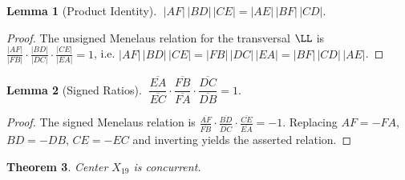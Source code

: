\documentclass[12pt,a4paper]{amsart}
\newtheorem{theorem}{Theorem} [section]
\newtheorem{lemma}[theorem]{Lemma}
\theoremstyle{remark}
\newcommand{\seg}[1]{\overline{#1}}
\begin{document}
\begin{lemma}[Product Identity]\label{lem:men1}
$\;|AF|\,|BD|\,|CE|=|AE|\,|BF|\,|CD|.$
\end{lemma}

\begin{proof}
The unsigned Menelaus relation for the transversal $\LL$ is
$\frac{|AF|}{|FB|}\cdot\frac{|BD|}{|DC|}\cdot\frac{|CE|}{|EA|}=1$, i.e.
$|AF|\,|BD|\,|CE|=|FB|\,|DC|\,|EA|=|BF|\,|CD|\,|AE|$.
\end{proof}

\begin{lemma}[Signed Ratios]\label{lem:men2}
$\;\dfrac{\seg{EA}}{\seg{EC}}\cdot\dfrac{\seg{FB}}{\seg{FA}}\cdot
\dfrac{\seg{DC}}{\seg{DB}}=1.$
\end{lemma}

\begin{proof}
The signed Menelaus relation is
$\frac{\seg{AF}}{\seg{FB}}\cdot\frac{\seg{BD}}{\seg{DC}}\cdot
\frac{\seg{CE}}{\seg{EA}}=-1$.
Replacing $AF=-FA$, $BD=-DB$, $CE=-EC$ and inverting  yields the asserted relation.
\end{proof}

\goodbreak
\begin{theorem}\label{thm:claw}
Center $X_{19}$ is concurrent.
\end{theorem}
\end{document}
